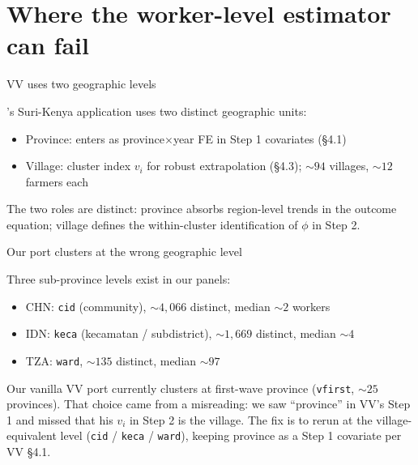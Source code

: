 \documentclass[10pt,aspectratio=169]{beamer}
\newcommand{\phicoef}{\phi}
\newcommand{\vii}{v_{i}}
\begin{document}
\section{Where the worker-level estimator can fail}

\begin{frame}{VV uses two geographic levels}

  \citet{verdierAverageTreatmentEffects2020a}'s Suri-Kenya application uses two distinct geographic units:
  \begin{itemize}
    \item Province: enters as province$\times$year FE in Step 1 covariates (\S4.1)
    \item Village: cluster index $\vii$ for robust extrapolation (\S4.3); $\sim 94$ villages, $\sim 12$ farmers each
  \end{itemize}

  \vspace{0.6em}
  The two roles are distinct: province absorbs region-level trends in the outcome equation; village defines the within-cluster identification of $\phicoef$ in Step 2.

\end{frame}

\begin{frame}{Our port clusters at the wrong geographic level}

  Three sub-province levels exist in our panels:
  \begin{itemize}
    \item CHN: \texttt{cid} (community), $\sim 4{,}066$ distinct, median $\sim 2$ workers
    \item IDN: \texttt{keca} (kecamatan / subdistrict), $\sim 1{,}669$ distinct, median $\sim 4$
    \item TZA: \texttt{ward}, $\sim 135$ distinct, median $\sim 97$
  \end{itemize}

  \vspace{0.6em}
  Our vanilla VV port currently clusters at first-wave province (\texttt{vfirst}, $\sim 25$ provinces).
  That choice came from a misreading: we saw ``province'' in VV's Step 1 and missed that his $\vii$ in Step 2 is the village.
  The fix is to rerun at the village-equivalent level (\texttt{cid} / \texttt{keca} / \texttt{ward}), keeping province as a Step 1 covariate per VV \S4.1.

\end{frame}
\end{document}
